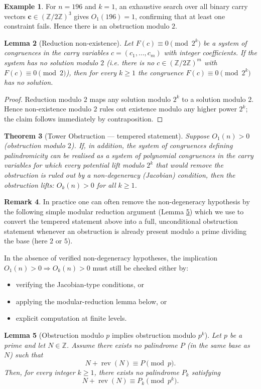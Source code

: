 \documentclass[11pt,a4paper]{article}
\theoremstyle{plain}
\newtheorem{theorem}{Theorem}[section]
\newtheorem{lemma}[theorem]{Lemma}
\theoremstyle{definition}
\newtheorem{example}[theorem]{Example}
\newtheorem{remark}[theorem]{Remark}
\begin{document}
\begin{example}
For $n = 196$ and $k=1$, an exhaustive search over all 
binary carry vectors $\mathbf{c} \in (\mathbb{Z}/2\mathbb{Z})^3$
gives $O_1(196) = 1$, confirming that at least one constraint fails.
Hence there is an obstruction modulo $2$.
\end{example}

%
\begin{lemma}[Reduction non-existence]
Let $F(c)\equiv 0\pmod{2^k}$ be a system of congruences in the carry variables $c=(c_1,\dots,c_m)$ with integer coefficients. If the system has no solution modulo $2$ (i.e. there is no $c\in(\mathbb Z/2\mathbb Z)^m$ with $F(c)\equiv0\pmod 2$), then for every $k\ge1$ the congruence $F(c)\equiv0\pmod{2^k}$ has no solution.
\end{lemma}
%
\begin{proof}
Reduction modulo $2$ maps any solution modulo $2^k$ to a solution modulo $2$. Hence non-existence modulo $2$ rules out existence modulo any higher power $2^k$; the claim follows immediately by contraposition.
\end{proof}
%
\begin{theorem}[Tower Obstruction --- tempered statement]
Suppose $O_1(n) > 0$ (obstruction modulo $2$). If, in addition, the system of congruences defining palindromicity can be realised as a system of polynomial congruences in the carry variables for which every potential lift modulo $2^k$ that would remove the obstruction is ruled out by a non-degeneracy (Jacobian) condition, then the obstruction lifts: $O_k(n) > 0$ for all $k\ge 1$.
\end{theorem}

\begin{remark}
In practice one can often remove the non-degeneracy hypothesis by the following simple modular reduction argument (Lemma \ref{lem:mod_p_lift}) which we use to convert the tempered statement above into a full, unconditional obstruction statement whenever an obstruction is already present modulo a prime dividing the base (here $2$ or $5$).

In the absence of verified non-degeneracy hypotheses, the implication $O_1(n)>0 \Rightarrow O_k(n)>0$ must still be checked either by:
\begin{itemize}
\item verifying the Jacobian-type conditions, or
\item applying the modular-reduction lemma below, or
\item explicit computation at finite levels.
\end{itemize}
\end{remark}
%
\begin{lemma}[Obstruction modulo $p$ implies obstruction modulo $p^k$]\label{lem:mod_p_lift}
Let $p$ be a prime and let $N\in\mathbb{Z}$.  
Assume there exists no palindrome $P$ (in the same base as $N$) such that
\[
N + \operatorname{rev}(N) \equiv P \pmod p.
\]
Then, for every integer $k \ge 1$, there exists no palindrome $P_k$ satisfying
\[
N + \operatorname{rev}(N) \equiv P_k \pmod{p^k}.
\]
\end{lemma}
\end{document}

